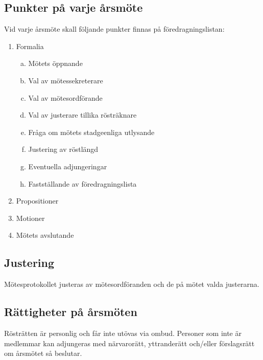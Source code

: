         \subsection{Punkter på varje årsmöte}
        \label{subsec:punkterpavarjearsmote}
                Vid varje årsmöte skall följande punkter finnas på föredragningslistan:
                \begin{enumerate}[1.]
                \setlength{\itemsep}{0.0cm}
                \setlength{\parskip}{0.0cm}
                        \item Formalia
                        \begin{enumerate}[a.]
                        \setlength{\itemsep}{0.0cm}
                        \setlength{\parskip}{0.0cm}
                                \item Mötets öppnande
                                \item Val av mötessekreterare
                                \item Val av mötesordförande
                                \item Val av justerare tillika rösträknare
                                \item Fråga om mötets stadgeenliga utlysande
                                \item Justering av röstlängd
                                \item Eventuella adjungeringar
                                \item Fastställande av föredragningslista
                        \end{enumerate}
                        \item Propositioner
                        \item Motioner
                \setcounter{enumi}{6}
                        \item Mötets avslutande
                \end{enumerate}

        \subsection{Justering}
        \label{subsec:justering}
                Mötesprotokollet justeras av mötesordföranden och de på mötet valda justerarna.

        \subsection{Rättigheter på årsmöten}
        \label{subsec:rattigheterpaarsmoten}
                Rösträtten är personlig och får inte utövas via ombud. Personer som inte är medlemmar kan adjungeras med närvarorätt, yttranderätt och/eller förslagsrätt om årsmötet så beslutar.

